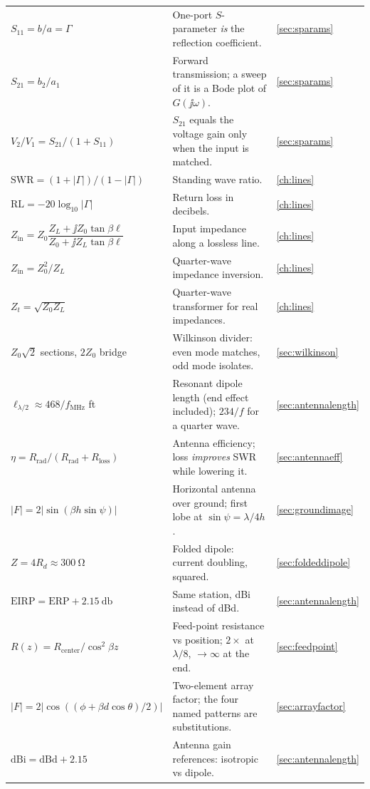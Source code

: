 \begin{longtable}{@{}L{0.31\textwidth}L{0.47\textwidth}L{0.14\textwidth}@{}}
\(S_{11}=b/a=\Gamma\) & One-port \(S\)-parameter \emph{is} the reflection coefficient. & \cref{sec:sparams} \\
\(S_{21}=b_2/a_1\) & Forward transmission; a sweep of it is a Bode plot of \(G(\jj\omega)\). & \cref{sec:sparams} \\
\(V_2/V_1=S_{21}/(1+S_{11})\) & \(S_{21}\) equals the voltage gain only when the input is matched. & \cref{sec:sparams} \\
\(\mathrm{SWR}=(1+|\Gamma|)/(1-|\Gamma|)\) & Standing wave ratio. & \cref{ch:lines} \\
\(\mathrm{RL}=-20\log_{10}|\Gamma|\) & Return loss in decibels. & \cref{ch:lines} \\
\(Z_{\mathrm{in}}=Z_0\dfrac{Z_L+\jj Z_0\tan\beta\ell}{Z_0+\jj Z_L\tan\beta\ell}\) & Input impedance along a lossless line. & \cref{ch:lines} \\
\(Z_{\mathrm{in}}=Z_0^2/Z_L\) & Quarter-wave impedance inversion. & \cref{ch:lines} \\
\(Z_t=\sqrt{Z_0Z_L}\) & Quarter-wave transformer for real impedances. & \cref{ch:lines} \\
\(Z_0\sqrt2\) sections, \(2Z_0\) bridge & Wilkinson divider: even mode matches, odd mode isolates. & \cref{sec:wilkinson} \\
\(\ell_{\lambda/2}\approx468/f_{\mathrm{MHz}}\) ft & Resonant dipole length (end effect included); \(234/f\) for a quarter wave. & \cref{sec:antennalength} \\
\(\eta=R_{\mathrm{rad}}/(R_{\mathrm{rad}}+R_{\mathrm{loss}})\) & Antenna efficiency; loss \emph{improves} SWR while lowering it. & \cref{sec:antennaeff} \\
\(|F|=2|\sin(\beta h\sin\psi)|\) & Horizontal antenna over ground; first lobe at \(\sin\psi=\lambda/4h\). & \cref{sec:groundimage} \\
\(Z=4R_d\approx\SI{300}{\ohm}\) & Folded dipole: current doubling, squared. & \cref{sec:foldeddipole} \\
\(\mathrm{EIRP}=\mathrm{ERP}+\SI{2.15}{\decibel}\) & Same station, dBi instead of dBd. & \cref{sec:antennalength} \\
\(R(z)=R_{\mathrm{center}}/\cos^2\beta z\) & Feed-point resistance vs position; \(2\times\) at \(\lambda/8\), \(\to\infty\) at the end. & \cref{sec:feedpoint} \\
\(|F|=2|\cos((\phi+\beta d\cos\theta)/2)|\) & Two-element array factor; the four named patterns are substitutions. & \cref{sec:arrayfactor} \\
\(\mathrm{dBi}=\mathrm{dBd}+2.15\) & Antenna gain references: isotropic vs dipole. & \cref{sec:antennalength} \\

\end{longtable}
